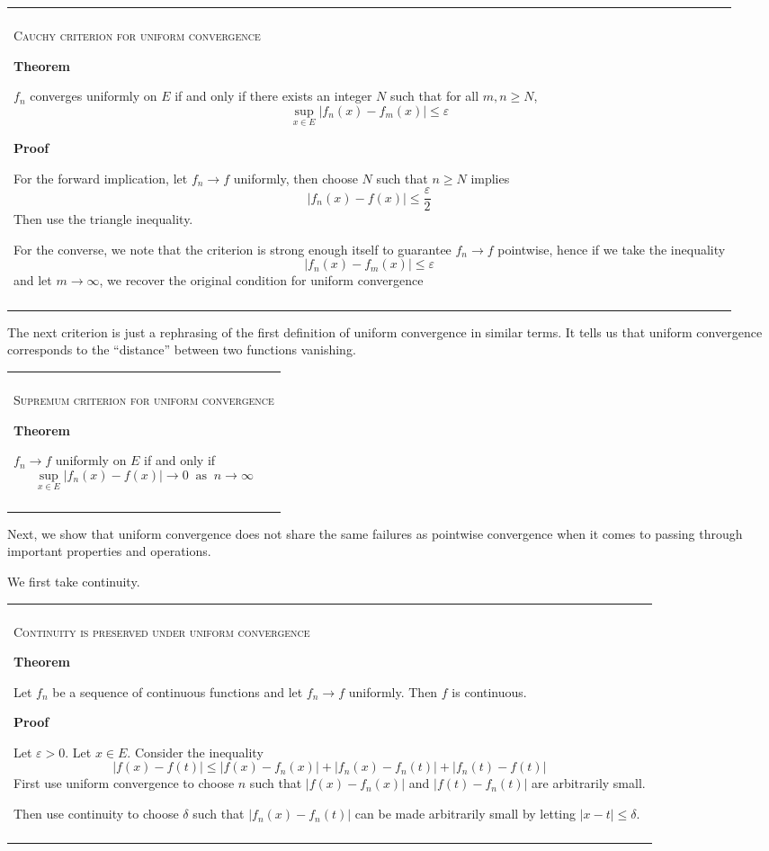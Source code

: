 \documentclass{article}
\newenvironment{myboxed}{\bigskip\noindent\begin{tabular}{|p{.975\linewidth}|}\hline \\}{\\\\\hline\end{tabular}\bigskip}
\begin{document}
\begin{myboxed}
    \textsc{Cauchy criterion for uniform convergence}

    \textbf{Theorem}

    $f_n$ converges uniformly on $E$ if and only if there exists an integer $N$ such that for all $m, n \geq N$,
    \[\sup_{x \in E}|f_n(x) - f_m(x)| \leq \varepsilon\]

    \textbf{Proof}

    For the forward implication, let $f_n \rightarrow f$ uniformly, then choose $N$ such that $n \geq N$ implies 
    \[|f_n(x) - f(x)| \leq \frac{\varepsilon}{2}\]
    Then use the triangle inequality.

    For the converse, we note that the criterion is strong enough itself to guarantee $f_n \rightarrow f$ pointwise, hence if we take the inequality
    \[|f_n(x) - f_m(x)| \leq \varepsilon\]
    and let $m \rightarrow \infty$, we recover the original condition for uniform convergence
\end{myboxed}

The next criterion is just a rephrasing of the first definition of uniform convergence in similar terms. It tells us that uniform convergence corresponds to the ``distance'' between two functions vanishing.

\begin{myboxed}
    \textsc{Supremum criterion for uniform convergence}

    \textbf{Theorem}

    $f_n \rightarrow f$ uniformly on $E$ if and only if 
    \[\sup_{x \in E}|f_n(x) - f(x)| \rightarrow 0 \:\text{ as }\: n \rightarrow \infty\]
\end{myboxed}

Next, we show that uniform convergence does not share the same failures as pointwise convergence when it comes to passing through important properties and operations.

We first take continuity.

\begin{myboxed}
    \textsc{Continuity is preserved under uniform convergence}

    \textbf{Theorem}

    Let $f_n$ be a sequence of continuous functions and let $f_n \rightarrow f$ uniformly. Then $f$ is continuous.

    \textbf{Proof}

    Let $\varepsilon > 0$. Let $x \in E$. Consider the inequality
    \[|f(x) - f(t)| \leq |f(x) - f_n(x)| + |f_n(x) - f_n(t)| + |f_n(t) - f(t)|\]
First use uniform convergence to choose $n$ such that $|f(x) - f_n(x)|$ and $|f(t) - f_n(t)|$ are arbitrarily small. 

Then use continuity to choose $\delta$ such that $|f_n(x) - f_n(t)|$ can be made arbitrarily small by letting $|x-t| \leq \delta$.
\end{myboxed}
\end{document}
